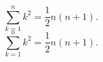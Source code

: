 \documentclass[../main.tex]{subfiles}
\begin{document}
\[ \sum_{k=1}^n k^2 = \frac{1}{2} n (n+1).\]
\[ \sum_{k=1}^n k^2 = \frac{1}{2} n (n+1).\]
\end{document}
